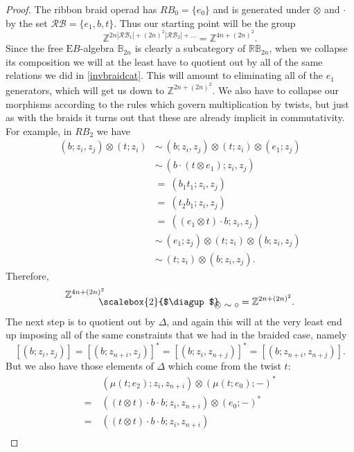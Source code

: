 \documentclass{amsbook} %
\newcommand{\bigquotient}[2]{ \raisebox{0.75\height}{$#1$} \mkern-12mu\scalebox{2}{$\diagup$}\mkern-10mu \raisebox{-0.5\height}{$#2$} }
\numberwithin{section}{chapter}
\begin{document}
\begin{proof}
The ribbon braid operad has $RB_0 = \{e_0\}$ and is generated under $\otimes$ and $\cdot$ by the set $\mathcal{RB} = \{ e_1, b, t \}$. Thus our starting point will be the group
  \[
    \mathbb{Z}^{2n|\mathcal{RB}_1| + (2n)^2|\mathcal{RB}_2| + \ldots} = \mathbb{Z}^{4n + (2n)^2}.
  \]
Since the free $\mathrm{E}B$-algebra $\mathbb{B}_{2n}$ is clearly a subcategory of $\mathbb{RB}_{2n}$, when we collapse its composition we will at the least have to quotient out by all of the same relations we did in \cref{invbraidcat}. This will amount to eliminating all of the $e_1$ generators, which will get us down to $\mathbb{Z}^{2n + (2n)^2}$. We also have to collapse our morphisms according to the rules which govern multiplication by twists, but just as with the braids it turns out that these are already implicit in commutativity. For example, in $RB_2$ we have
  \begin{align*}
  	 (b;  z_i, z_j  ) \otimes (  t  ;  z_i ) &\sim~(  b  ;  z_i, z_j  ) \otimes (  t  ;  z_i ) \otimes (e_1; z_j) \\
  	&\sim~\left(  b \cdot (t \otimes e_1)  ;  z_i, z_j  \right) \\	
  	&=~(  b_1 t_1  ;  z_i, z_j ) \\
  	&=~(  t_2 b_1  ;  z_i, z_j ) \\
  	&=~\left(  (e_1 \otimes t) \cdot b  ;  z_i, z_j  \right) \\
  	&\sim~(e_1; z_j) \otimes ( t ; z_i ) \otimes ( b; z_i, z_j ) \\
  	&\sim~( t ;z_i ) \otimes ( b ; z_i, z_j).
  \end{align*}
Therefore,
  \[
    \bigquotient{\mathbb{Z}^{4n + (2n)^2}}{\otimes \sim \circ} = \mathbb{Z}^{2n + (2n)^2}.
  \]
The next step is to quotient out by $\Delta$, and again this will at the very least end up imposing all of the same constraints that we had in the braided case, namely
  \[
    [  (  b  ; z_i, z_j  )  ] = [  (  b  ;  z_{n+i}, z_j  )  ]^* =  [  (  b  ;  z_i, z_{n+j}  )  ]^* = [  (  b  ;  z_{n+i}, z_{n+j}  )  ].
  \]
But we also have those elements of $\Delta$ which come from the twist $t$:
  \begin{align*}
  	&\left(  \mu(  t  ;  e_2  )  ;  z_i, z_{n+i}  \right)  \otimes  \left(   \mu(  t  ;  e_0  )  ;  -  \right)^* \\
  	=~&\left(  (  t \otimes t  ) \cdot b \cdot b  ;  z_i, z_{n+i}  \right)  \otimes  (e_0 ; - )^* \\
  	=~&\left(  (  t \otimes t  ) \cdot b \cdot b  ;  z_i, z_{n+i}  \right) \\

\end{align*}
\end{proof}
\end{document}
